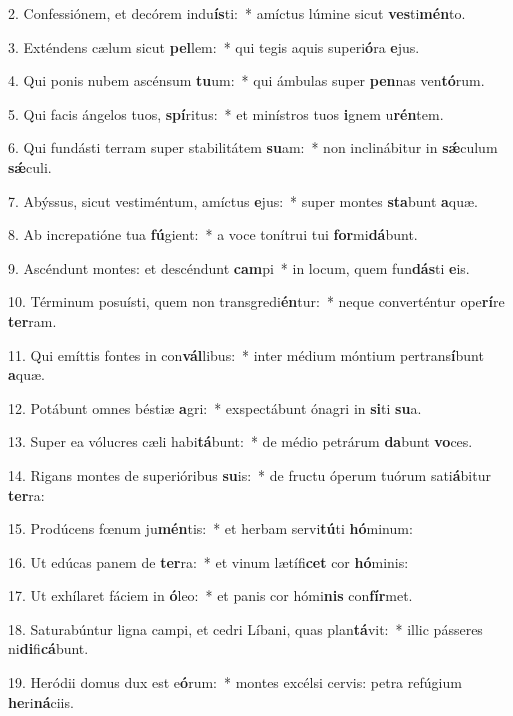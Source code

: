 2. Confessiónem, et decórem indu\textbf{ís}ti:~*  amíctus lúmine sicut \textbf{ves}ti\textbf{mén}to.\

3. Exténdens cælum sicut \textbf{pel}lem:~*  qui tegis aquis superi\textbf{ó}ra \textbf{e}jus.\

4. Qui ponis nubem ascénsum \textbf{tu}um:~*  qui ámbulas super \textbf{pen}nas ven\textbf{tó}rum.\

5. Qui facis ángelos tuos, \textbf{spí}ritus:~*  et minístros tuos \textbf{i}gnem u\textbf{rén}tem.\

6. Qui fundásti terram super stabilitátem \textbf{su}am:~*  non inclinábitur in \textbf{sǽ}culum \textbf{sǽ}culi.\

7. Abýssus, sicut vestiméntum, amíctus \textbf{e}jus:~*  super montes \textbf{sta}bunt \textbf{a}quæ.\

8. Ab increpatióne tua \textbf{fú}gient:~*  a voce tonítrui tui \textbf{for}mi\textbf{dá}bunt.\

9. Ascéndunt montes: et descéndunt \textbf{cam}pi~*  in locum, quem fun\textbf{dás}ti \textbf{e}is.\

10. Términum posuísti, quem non transgredi\textbf{én}tur:~*  neque converténtur ope\textbf{rí}re \textbf{ter}ram.\

11. Qui emíttis fontes in con\textbf{vál}libus:~*  inter médium móntium pertrans\textbf{í}bunt \textbf{a}quæ.\

12. Potábunt omnes béstiæ \textbf{a}gri:~*  exspectábunt ónagri in \textbf{si}ti \textbf{su}a.\

13. Super ea vólucres cæli habi\textbf{tá}bunt:~*  de médio petrárum \textbf{da}bunt \textbf{vo}ces.\

14. Rigans montes de superióribus \textbf{su}is:~*  de fructu óperum tuórum sati\textbf{á}bitur \textbf{ter}ra:\

15. Prodúcens fœnum ju\textbf{mén}tis:~*  et herbam servi\textbf{tú}ti \textbf{hó}minum:\

16. Ut edúcas panem de \textbf{ter}ra:~*  et vinum lætífi\textbf{cet} cor \textbf{hó}minis:\

17. Ut exhílaret fáciem in \textbf{ó}leo:~*  et panis cor hómi\textbf{nis} con\textbf{fír}met.\

18. Saturabúntur ligna campi, et cedri Líbani, quas plan\textbf{tá}vit:~*  illic pásseres ni\textbf{di}fi\textbf{cá}bunt.\

19. Heródii domus dux est e\textbf{ó}rum:~*  montes excélsi cervis: petra refúgium \textbf{he}ri\textbf{ná}ciis.\

